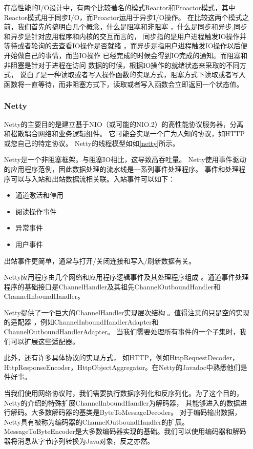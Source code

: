 在高性能的I/O设计中，有两个比较著名的模式Reactor和Proactor模式，其中Reactor模式用于同步I/O，而Proactor运用于异步I/O操作。
在比较这两个模式之前，我们首先的搞明白几个概念，什么是阻塞和非阻塞
，什么是同步和异步,同步和异步是针对应用程序和内核的交互而言的，
同步指的是用户进程触发IO操作并等待或者轮询的去查看IO操作是否就绪
，而异步是指用户进程触发IO操作以后便开始做自己的事情，而当IO操作
已经完成的时候会得到IO完成的通知。而阻塞和非阻塞是针对于进程在访问
数据的时候，根据IO操作的就绪状态来采取的不同方式，
说白了是一种读取或者写入操作函数的实现方式，阻塞方式下读取或者写入函数将一直等待，而非阻塞方式下，读取或者写入函数会立即返回一个状态值。
\subsubsection{Netty}
Netty的主要目的是建立基于NIO（或可能的NIO.2）的高性能协议服务器，分离和松散耦合网络和业务逻辑组件。
它可能会实现一个广为人知的协议，如HTTP或您自己的特定协议。
Netty的线程模型如如\ref{netty}所示。


Netty是一个非阻塞框架。与阻塞IO相比，这导致高吞吐量。
Netty使用事件驱动的应用程序范例，因此数据处理的流水线是一系列事件处理程序。
事件和处理程序可以与入站和出站数据流相关联。入站事件可以如下：

\begin{itemize}
	\item 通道激活和停用
\item 阅读操作事件
\item 异常事件
\item 用户事件
\end{itemize}
出站事件更简单，通常与打开/关闭连接和写入/刷新数据有关。

Netty应用程序由几个网络和应用程序逻辑事件及其处理程序组成
。通道事件处理程序的基础接口是ChannelHandler及其祖先ChannelOutboundHandler和ChannelInboundHandler。

Netty提供了一个巨大的ChannelHandler实现层次结构
。值得注意的只是空的实现的适配器
，例如ChannelInboundHandlerAdapter和ChannelOutboundHandlerAdapter。
当我们需要处理所有事件的一个子集时，我们可以扩展这些适配器。

此外，还有许多具体协议的实现方式，
如HTTP，例如HttpRequestDecoder，HttpResponseEncoder，HttpObjectAggregator。在Netty的Javadoc中熟悉他们是件好事。


当我们使用网络协议时，我们需要执行数据序列化和反序列化。为了这个目的，
Netty的介绍的特殊扩展ChannelInboundHandler为解码器，
其能够进入的数据进行解码。大多数解码器的基类是ByteToMessageDecoder。
对于编码输出数据，Netty具有被称为编码器的ChannelOutboundHandler的扩展。
MessageToByteEncoder是大多数编码器实现的基础。我们可以使用编码器和解码器将消息从字节序列转换为Java对象，反之亦然。

